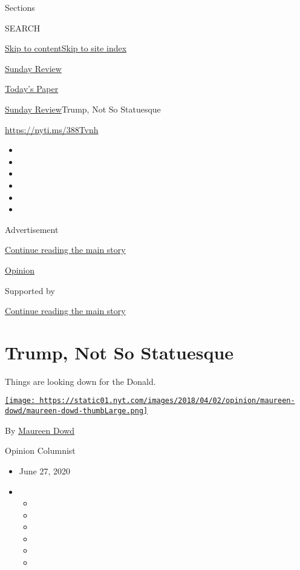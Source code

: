 Sections

SEARCH

\protect\hyperlink{site-content}{Skip to
content}\protect\hyperlink{site-index}{Skip to site index}

\href{https://www.nytimes.com/section/opinion/sunday}{Sunday Review}

\href{https://myaccount.nytimes.com/auth/login?response_type=cookie\&client_id=vi}{}

\href{https://www.nytimes.com/section/todayspaper}{Today's Paper}

\href{/section/opinion/sunday}{Sunday Review}\textbar{}Trump, Not So
Statuesque

\href{https://nyti.ms/388Tvnh}{https://nyti.ms/388Tvnh}

\begin{itemize}
\item
\item
\item
\item
\item
\item
\end{itemize}

Advertisement

\protect\hyperlink{after-top}{Continue reading the main story}

\href{/section/opinion}{Opinion}

Supported by

\protect\hyperlink{after-sponsor}{Continue reading the main story}

\hypertarget{trump-not-so-statuesque}{%
\section{Trump, Not So Statuesque}\label{trump-not-so-statuesque}}

Things are looking down for the Donald.

\href{https://www.nytimes.com/by/maureen-dowd}{\texttt{[image: https://static01.nyt.com/images/2018/04/02/opinion/maureen-dowd/maureen-dowd-thumbLarge.png]}}

By \href{https://www.nytimes.com/by/maureen-dowd}{Maureen Dowd}

Opinion Columnist

\begin{itemize}
\item
  June 27, 2020
\item
  \begin{itemize}
  \item
  \item
  \item
  \item
  \item
  \item
  \end{itemize}
\end{itemize}

